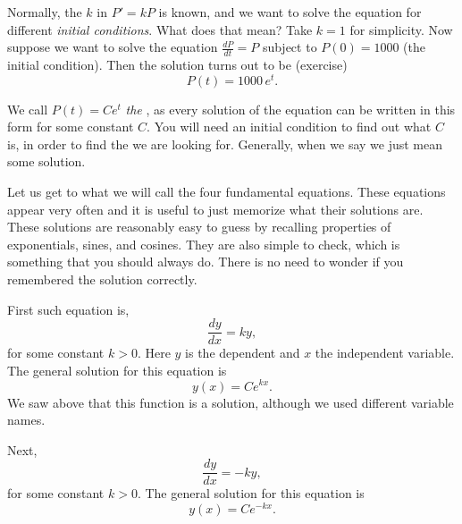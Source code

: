 Normally, the $k$ in $P' = kP$ is known,
and we want to solve
the equation for different \emph{initial conditions}.
What does that mean?
Take $k=1$ for simplicity.  Now suppose we want to solve the equation
$\frac{dP}{dt} = P$ 
subject to $P(0) = 1000$ (the initial condition).
Then the solution turns out to be (exercise)
\begin{equation*}
P(t) = 1000 \, e^t .
\end{equation*}

We call $P(t) = C e^t$ \emph{the },
as every solution
of the equation can be written in this form for some constant $C$.  You
will need an initial condition to find out what $C$ is, in order to find the
\emph{} we are looking for.  Generally, when we say
 we just mean some solution.

\medskip

Let us get to what we will call the four fundamental equations.
These equations appear very often and it is useful to just memorize what
their solutions are.
These solutions
are reasonably easy
to guess by recalling properties of exponentials, sines, and cosines.
They are also simple to check, which is something that you should always do.
There is no need to wonder if you remembered the solution correctly.

\medskip

First such equation is,
\begin{equation*}
\frac{dy}{dx} = k y ,
\end{equation*}
for some constant $k > 0$.
Here $y$ is the dependent and $x$ the independent variable.
The general solution for this equation is
\begin{equation*}
y(x) = C e^{kx} .
\end{equation*}
We saw above that this function is a solution, although we used different
variable names.

\medskip

Next,
\begin{equation*}
\frac{dy}{dx} = -k y ,
\end{equation*}
for some constant $k > 0$.
The general solution for this equation is
\begin{equation*}
y(x) = C e^{-kx} .
\end{equation*}

